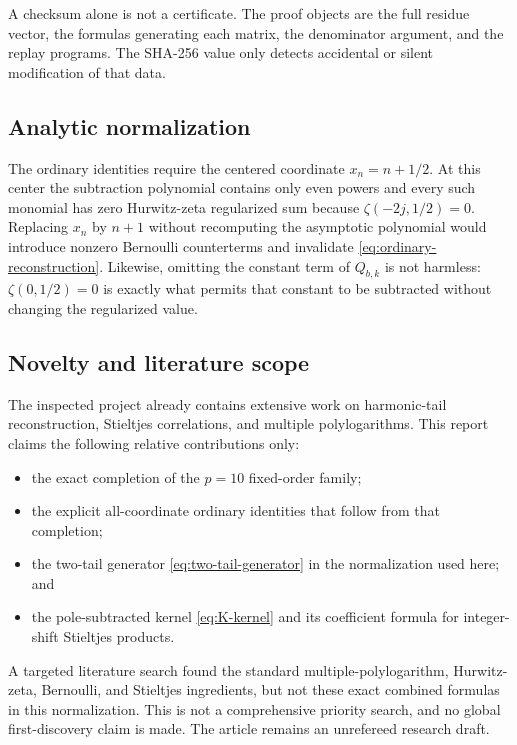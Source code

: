 A checksum alone is not a certificate.  The proof objects are the full
residue vector, the formulas generating each matrix, the denominator
argument, and the replay programs.  The SHA-256 value only detects
accidental or silent modification of that data.

\subsection{Analytic normalization}

The ordinary identities require the centered coordinate
$x_n=n+1/2$.  At this center the subtraction polynomial contains only
even powers and every such monomial has zero Hurwitz-zeta regularized
sum because $\zeta(-2j,1/2)=0$.  Replacing $x_n$ by $n+1$ without
recomputing the asymptotic polynomial would introduce nonzero Bernoulli
counterterms and invalidate \eqref{eq:ordinary-reconstruction}.
Likewise, omitting the constant term of $Q_{b,k}$ is not harmless:
$\zeta(0,1/2)=0$ is exactly what permits that constant to be subtracted
without changing the regularized value.

\subsection{Novelty and literature scope}

The inspected project already contains extensive work on harmonic-tail
reconstruction, Stieltjes correlations, and multiple polylogarithms.
This report claims the following relative contributions only:

\begin{itemize}
\item the exact completion of the $p=10$ fixed-order family;
\item the explicit all-coordinate ordinary identities that follow from
that completion;
\item the two-tail generator \eqref{eq:two-tail-generator} in the
normalization used here; and
\item the pole-subtracted kernel \eqref{eq:K-kernel} and its coefficient
formula for integer-shift Stieltjes products.
\end{itemize}

A targeted literature search found the standard multiple-polylogarithm,
Hurwitz-zeta, Bernoulli, and Stieltjes ingredients, but not these exact
combined formulas in this normalization.  This is not a comprehensive
priority search, and no global first-discovery claim is made.  The
article remains an unrefereed research draft.

